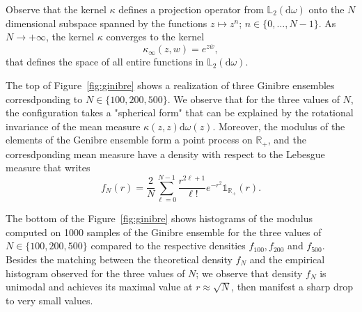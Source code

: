 \documentclass[twoside,11pt]{book}
\numberwithin{theorem}{chapter}
\numberwithin{definition}{chapter}
\numberwithin{proposition}{chapter}
\numberwithin{corollary}{chapter}
\numberwithin{example}{chapter}
\numberwithin{lemma}{chapter}
\numberwithin{assumption}{chapter}
\begin{document}



Observe that the kernel $\kappa$ defines a projection operator from $\mathbb{L}_{2}(\mathrm{d}\omega)$ onto the $N$ dimensional subspace spanned by the functions $z \mapsto z^{n}$; $n \in \{0, \dots, N-1 \}$. As $N \rightarrow +\infty$, the kernel $\kappa$ converges to the kernel
\begin{equation}
\kappa_{\infty}(z,w) = e^{z \overline{w}},
\end{equation} 
that defines the space
of all entire functions in $\mathbb{L}_{2}(\mathrm{d}\omega)$. 

The top of Figure~\ref{fig:ginibre} shows a  realization of three Ginibre ensembles corresdponding to $N \in \{100,200,500\}$. We observe that for the three values of $N$, the configuration takes a "spherical form" that can be explained by the rotational invariance of the mean measure $\kappa(z,z) \mathrm{d}\omega(z)$. Moreover, the modulus of the elements of the Genibre ensemble form a point process on $\mathbb{R}_{+}$, and the corresdponding mean measure have a density with respect to the Lebesgue measure that writes
\begin{equation}
f_{N}(r) = \frac{2}{N}\sum\limits_{\ell =0}^{N-1} \frac{r^{2\ell+1}}{\ell!}e^{-r^{2}} \mathbb{1}_{\mathbb{R}_{+}}(r).
\end{equation}

The bottom of the Figure~\ref{fig:ginibre} shows histograms of the modulus computed on 1000 samples of the Ginibre ensemble for the three values of $N \in \{100,200,500\}$  compared to the respective densities $f_{100},f_{200}$ and $f_{500}$. Besides the matching between the theoretical density $f_{N}$ and the empirical histogram observed for the three values of $N$; we observe that density $f_{N}$ is unimodal and achieves its maximal value at $r \approx \sqrt{N}$, then manifest a sharp drop to very small values.


\end{document}
